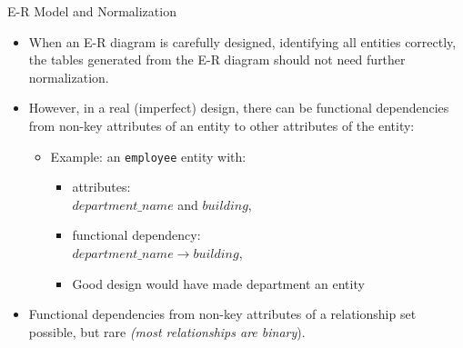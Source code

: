 \documentclass[aspectratio=169]{beamer}
\begin{document}
\begin{frame}{E-R Model and Normalization}
    \begin{itemize}
        \item When an E-R diagram is carefully designed, identifying all entities correctly, the tables generated from the E-R diagram should not need further normalization.
        \item However, in a real (imperfect) design, there can be functional dependencies from non-key attributes of an entity to other attributes of the entity:
            \begin{itemize}
                \item Example: an \texttt{employee} entity with:
                    \begin{itemize}
                        \item attributes: \\
                            \quad $department\_name$ and $building$,
                        \item functional dependency: \\
                            \quad $department\_name \rightarrow building$,
                        \item Good design would have made department an entity
                    \end{itemize}

            \end{itemize}
        \item Functional dependencies from non-key attributes of a relationship set possible, but rare \textit{(most relationships are binary}).
    \end{itemize}
\end{frame}
\end{document}
